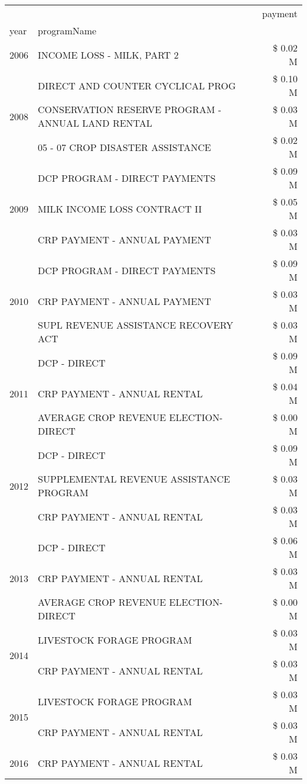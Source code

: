 \begin{tabular}{llr}
\toprule
 &  & payment \\
year & programName &  \\
\midrule
2006 & INCOME LOSS - MILK, PART 2 & \$ 0.02 M \\
\cline{1-3}
\multirow[t]{3}{*}{2008} & DIRECT AND COUNTER CYCLICAL PROG & \$ 0.10 M \\
 & CONSERVATION RESERVE PROGRAM - ANNUAL LAND RENTAL & \$ 0.03 M \\
 & 05 - 07 CROP DISASTER ASSISTANCE & \$ 0.02 M \\
\cline{1-3}
\multirow[t]{3}{*}{2009} & DCP PROGRAM - DIRECT PAYMENTS & \$ 0.09 M \\
 & MILK INCOME LOSS CONTRACT II & \$ 0.05 M \\
 & CRP PAYMENT - ANNUAL PAYMENT & \$ 0.03 M \\
\cline{1-3}
\multirow[t]{3}{*}{2010} & DCP PROGRAM - DIRECT PAYMENTS & \$ 0.09 M \\
 & CRP PAYMENT - ANNUAL PAYMENT & \$ 0.03 M \\
 & SUPL REVENUE ASSISTANCE RECOVERY ACT & \$ 0.03 M \\
\cline{1-3}
\multirow[t]{3}{*}{2011} & DCP - DIRECT & \$ 0.09 M \\
 & CRP PAYMENT - ANNUAL RENTAL & \$ 0.04 M \\
 & AVERAGE CROP REVENUE ELECTION-DIRECT & \$ 0.00 M \\
\cline{1-3}
\multirow[t]{3}{*}{2012} & DCP - DIRECT & \$ 0.09 M \\
 & SUPPLEMENTAL REVENUE ASSISTANCE PROGRAM & \$ 0.03 M \\
 & CRP PAYMENT - ANNUAL RENTAL & \$ 0.03 M \\
\cline{1-3}
\multirow[t]{3}{*}{2013} & DCP - DIRECT & \$ 0.06 M \\
 & CRP PAYMENT - ANNUAL RENTAL & \$ 0.03 M \\
 & AVERAGE CROP REVENUE ELECTION-DIRECT & \$ 0.00 M \\
\cline{1-3}
\multirow[t]{2}{*}{2014} & LIVESTOCK FORAGE PROGRAM & \$ 0.03 M \\
 & CRP PAYMENT - ANNUAL RENTAL & \$ 0.03 M \\
\cline{1-3}
\multirow[t]{2}{*}{2015} & LIVESTOCK FORAGE PROGRAM & \$ 0.03 M \\
 & CRP PAYMENT - ANNUAL RENTAL & \$ 0.03 M \\
\cline{1-3}
\multirow[t]{3}{*}{2016} & CRP PAYMENT - ANNUAL RENTAL                   & \$ 0.03 M \\

\end{tabular}
